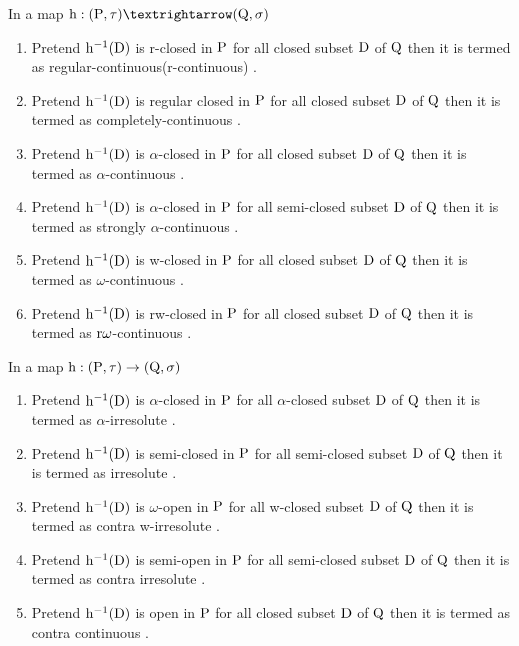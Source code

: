 \begin{dfn}\label{dfn1.3.1}
In a map $\TSh: (\TSP, \tau) →(\TSQ, \sigma)$
\begin{enumerate}
\item Pretend $\mathrm{h}^{-1}(\mathrm{D})$ is r-closed in $\mathrm{P}$ for all closed subset $\mathrm{D}$ of $\mathrm{Q}$ then it is termed as regular-continuous(r-continuous) \cite{Arya1}. 
\item Pretend $\mathrm{h}^{-1}(\mathrm{D})$ is regular closed in $\mathrm{P}$ for all closed subset $\mathrm{D}$ of $\mathrm{Q}$ then it is termed as completely-continuous \cite{Levine2}. 
\item Pretend $\mathrm{h}^{-1}(\mathrm{D})$ is $\alpha$-closed in $\mathrm{P}$ for all closed subset $\mathrm{D}$ of $\mathrm{Q}$ then it is termed as $\alpha$-continuous \cite{Maki11}. 
\item Pretend $\mathrm{h}^{-1}(\mathrm{D})$ is $\alpha$-closed in $\mathrm{P}$ for all semi-closed subset $\mathrm{D}$ of $\mathrm{Q}$ then it is termed as strongly $\alpha$-continuous \cite{Maki11}. 
\item Pretend $\mathrm{h}^{-1}(\mathrm{D})$ is w-closed in $\mathrm{P}$ for all closed subset $\mathrm{D}$ of $\mathrm{Q}$ then it is termed as $\omega$-continuous \cite{Sheik}. 
\item Pretend $\mathrm{h}^{-1}(\mathrm{D})$ is rw-closed in $\mathrm{P}$ for all closed subset $\mathrm{D}$ of $\mathrm{Q}$ then it is termed as $\mathrm{r}\omega$-continuous \cite{Benchalli}. 
\end{enumerate}
\end{dfn}

\begin{dfn}\label{dfn1.3.2} 
In a map $\mathrm{h}: (\mathrm{P}, \tau) \rightarrow (\mathrm{Q}, \sigma)$
\begin{enumerate}
\item Pretend $\mathrm{h}^{-1}(\mathrm{D})$ is $\alpha$-closed in $\mathrm{P}$ for all $\alpha$-closed subset $\mathrm{D}$ of $\mathrm{Q}$ then it is termed as $\alpha$-irresolute \cite{Maki11}. 
\item Pretend $\mathrm{h}^{-1}(\mathrm{D})$ is semi-closed in $\mathrm{P}$ for all semi-closed subset $\mathrm{D}$ of $\mathrm{Q}$ then it is termed as irresolute \cite{Crossley}.
\item Pretend $\mathrm{h}^{-1}(\mathrm{D})$ is $\omega$-open in $\mathrm{P}$ for all w-closed subset $\mathrm{D}$ of $\mathrm{Q}$ then it is termed as contra w-irresolute \cite{Sheik1}. 
\item Pretend $\mathrm{h}^{-1}(\mathrm{D})$ is semi-open in $\mathrm{P}$ for all semi-closed subset $\mathrm{D}$ of $\mathrm{Q}$ then it is termed as contra irresolute \cite{Baker}. 
\item Pretend $\mathrm{h}^{-1}(\mathrm{D})$ is open in $\mathrm{P}$ for all closed subset $\mathrm{D}$ of $\mathrm{Q}$ then it is termed as contra continuous \cite{Dontchev1}. 
\end{enumerate}
\end{dfn}


